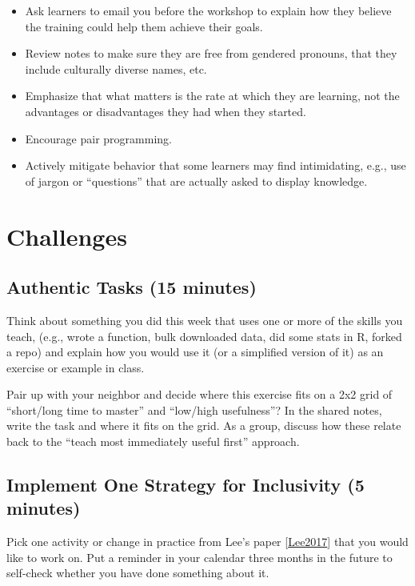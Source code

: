 \documentclass[10pt,statementpaper]{memoir}
\begin{document}
\begin{itemize}
\item
  Ask learners to email you before the workshop to explain how they
  believe the training could help them achieve their goals.
\item
  Review notes to make sure they are free from gendered pronouns, that
  they include culturally diverse names, etc.
\item
  Emphasize that what matters is the rate at which they are learning,
  not the advantages or disadvantages they had when they started.
\item
  Encourage pair programming.
\item
  Actively mitigate behavior that some learners may find intimidating,
  e.g., use of jargon or ``questions'' that are actually asked to
  display knowledge.
\end{itemize}

\section{Challenges}\label{challenges-6}

\subsection{Authentic Tasks (15
minutes)}\label{authentic-tasks-15-minutes}

Think about something you did this week that uses one or more of the
skills you teach, (e.g., wrote a function, bulk downloaded data, did
some stats in R, forked a repo) and explain how you would use it (or a
simplified version of it) as an exercise or example in class.

Pair up with your neighbor and decide where this exercise fits on a 2x2
grid of ``short/long time to master'' and ``low/high usefulness''? In
the shared notes, write the task and where it fits on the grid. As a
group, discuss how these relate back to the ``teach most immediately
useful first'' approach.

\subsection{Implement One Strategy for Inclusivity (5
minutes)}\label{implement-one-strategy-for-inclusivity-5-minutes}

Pick one activity or change in practice from Lee's paper
{[}\href{biblio.html\#lee-create-inclusive-community}{Lee2017}{]} that
you would like to work on. Put a reminder in your calendar three months
in the future to self-check whether you have done something about it.
\end{document}
